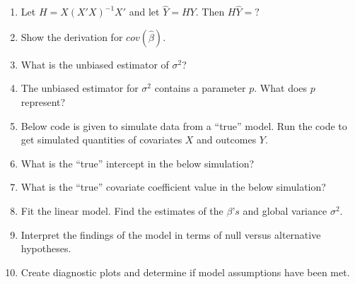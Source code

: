 \documentclass[
  letterpaper,
  DIV=11,
  numbers=noendperiod]{scrreprt}
\providecommand{\tightlist}{%
  \setlength{\itemsep}{0pt}\setlength{\parskip}{0pt}}\usepackage{longtable,booktabs,array}
\begin{document}
\begin{tcolorbox}[enhanced jigsaw, breakable, colbacktitle=quarto-callout-tip-color!10!white, left=2mm, colframe=quarto-callout-tip-color-frame, opacityback=0, coltitle=black, colback=white, rightrule=.15mm, title=\textcolor{quarto-callout-tip-color}{\faLightbulb}\hspace{0.5em}{TEST YOUR KNOWLEDGE}, titlerule=0mm, opacitybacktitle=0.6, leftrule=.75mm, toprule=.15mm, arc=.35mm, bottomtitle=1mm, toptitle=1mm, bottomrule=.15mm]

\begin{enumerate}
\def\labelenumi{\arabic{enumi}.}
\tightlist
\item
  Let \(H=X(X'X)^{-1}X'\) and let \(\hat{Y} = HY\). Then
  \(H\hat{Y} = ?\)
\item
  Show the derivation for \(cov(\hat{\beta})\).
\item
  What is the unbiased estimator of \(\sigma^2\)?
\item
  The unbiased estimator for \(\sigma^2\) contains a parameter \(p\).
  What does \(p\) represent?
\item
  Below code is given to simulate data from a ``true'' model. Run the
  code to get simulated quantities of covariates \(X\) and outcomes
  \(Y\).
\item
  What is the ``true'' intercept in the below simulation?
\item
  What is the ``true'' covariate coefficient value in the below
  simulation?
\item
  Fit the linear model. Find the estimates of the \(\beta’s\) and global
  variance \(\sigma^2\).
\item
  Interpret the findings of the model in terms of null versus
  alternative hypotheses.
\item
  Create diagnostic plots and determine if model assumptions have been
  met.
\end{enumerate}

\end{tcolorbox}
\end{document}
